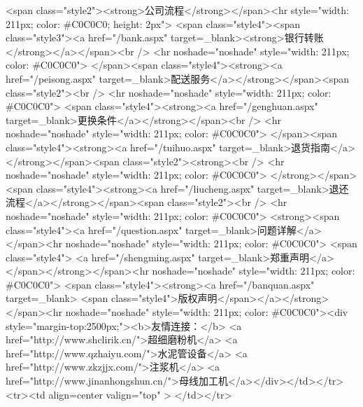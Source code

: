 <span class="style2"><strong>公司流程</strong></span><hr 
                                                                style="width: 211px; color: #C0C0C0; height: 2px">
                                                            <span class="style4"><span class="style3"><a href="/bank.aspx" target=_blank><strong>银行转账</strong></a></span><br />
                                                    <hr noshade="noshade" style="width: 211px; color: #C0C0C0">
                                                            </span><span class="style4"><strong><a href="/peisong.aspx" target=_blank>配送服务</a></strong></span><span class="style2"><br />
                                                    <hr noshade="noshade" style="width: 211px; color: #C0C0C0">
                                                            <span class="style4"><strong><a href="/genghuan.aspx" target=_blank>更换条件</a></strong></span><br />
                                                    <hr noshade="noshade" style="width: 211px; color: #C0C0C0">
                                                            </span><span class="style4"><strong><a href="/tuihuo.aspx" target=_blank>退货指南</a></strong></span><span class="style2"><strong><br />
                                                    <hr noshade="noshade" style="width: 211px; color: #C0C0C0">
                                                            </strong></span><span class="style4"><strong><a href="/liucheng.aspx" target=_blank>退还流程</a></strong></span><span class="style2"><br />
                                                    <hr noshade="noshade" style="width: 211px; color: #C0C0C0">
                                                            <strong><span class="style4"><a href="/question.aspx" target=_blank>问题详解</a></span><hr 
                                                                noshade="noshade" style="width: 211px; color: #C0C0C0">
                                                            <span class="style4">
                                                            <a href="/shengming.aspx" target=_blank>郑重声明</a></span></strong></span><hr 
                                                                noshade="noshade" style="width: 211px; color: #C0C0C0">
                                                            <span class="style4"><strong><a href="/banquan.aspx" target=_blank>
                                                            <span class="style4">版权声明</span></a></strong></span><hr 
                                                                noshade="noshade" style="width: 211px; color: #C0C0C0"><div style="margin-top:2500px;"><b>友情连接：</b>
<a href="http://www.shclirik.cn/">超细磨粉机</a>
<a href="http://www.qzhaiyu.com/">水泥管设备</a>
<a href="http://www.zkzjjx.com/">注浆机</a>
<a href="http://www.jinanhongshun.cn/">母线加工机</a></div></td></tr>
<tr><td align=center valign="top" >
    </td></tr>

